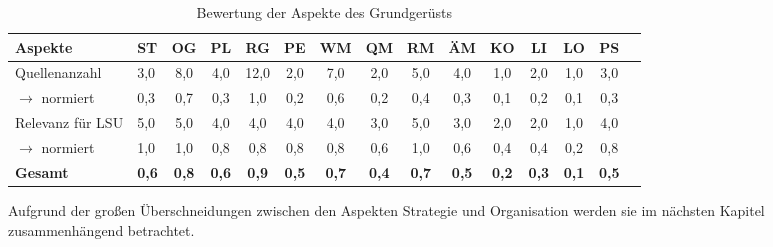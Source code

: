 \begin{table}[htbp]
\caption{Bewertung der Aspekte des Grundgerüsts}
\begin{center}
\begin{tabular}{llccccccccccccc}

\textbf{Aspekte} & \textbf{ST} & \textbf{OG} & \textbf{PL} & \textbf{RG} & \textbf{PE} & \textbf{WM} & \textbf{QM} & \textbf{RM} & \textbf{ÄM} & \textbf{KO} & \textbf{LI} & \textbf{LO} & \textbf{PS} \\ \hline
Quellenanzahl  & 3,0 & 8,0 & 4,0 & 12,0 & 2,0 & 7,0 & 2,0 & 5,0 & 4,0 & 1,0 & 2,0 & 1,0 & 3,0 \\ 
$\rightarrow$ normiert  & 0,3 & 0,7 & 0,3 & 1,0 & 0,2 & 0,6 & 0,2 & 0,4 & 0,3 & 0,1 & 0,2 & 0,1 & 0,3 \\ 
Relevanz für LSU  & 5,0 & 5,0 & 4,0 & 4,0 & 4,0 & 4,0 & 3,0 & 5,0 & 3,0 & 2,0 & 2,0 & 1,0 & 4,0 \\ 
$\rightarrow$ normiert &  1,0 & 1,0 & 0,8 & 0,8 & 0,8 & 0,8 & 0,6 & 1,0 & 0,6 & 0,4 & 0,4 & 0,2 & 0,8  \\ \hline  
\textbf{Gesamt} & \textbf{0,6} & \textbf{0,8} & \textbf{0,6} & \textbf{0,9} & \textbf{0,5} & \textbf{0,7} & \textbf{0,4} & \textbf{0,7} & \textbf{0,5} & \textbf{0,2} & \textbf{0,3} & \textbf{0,1} & \textbf{0,5} \\ 
\end{tabular}
\end{center}
\label{fig:auswahl_gg}
\end{table}




Aufgrund der großen Überschneidungen zwischen den Aspekten Strategie und Organisation werden sie im nächsten Kapitel zusammenhängend betrachtet. 
